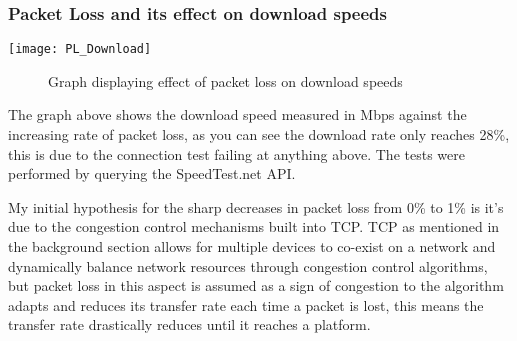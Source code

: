\subsubsection{Packet Loss and its effect on download speeds}

\begin{center}
	\texttt{[image: PL\_Download]}
	\begin{figure}[h]
	 	\caption{Graph displaying effect of packet loss on download speeds}
	\end{figure}		
\end{center}

The graph above shows the download speed measured in Mbps against the increasing rate of packet loss, as you can see the download rate only reaches 28\%, this is due to the connection test failing at anything above. The tests were performed by querying the SpeedTest.net  API. 

My initial hypothesis for the sharp decreases in packet loss from 0\% to 1\% is it's due to the congestion control mechanisms built into TCP. TCP as mentioned in the background section allows for multiple devices to co-exist on a network and dynamically balance network resources through congestion control algorithms, but packet loss in this aspect is assumed as a sign of congestion to the algorithm adapts and reduces its transfer rate each time a packet is lost, this means the transfer rate drastically reduces until it reaches a platform.




